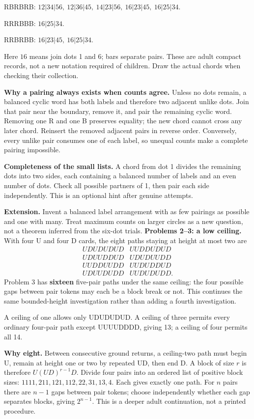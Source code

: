 \documentclass[11pt]{article}
\begin{document}
RBRBRB: \(12|34|56,\ 12|36|45,\ 14|23|56,\ 16|23|45,\ 16|25|34\).

RRRBBB: \(16|25|34\).

RRBRBB: \(16|23|45,\ 16|25|34\).

Here \(16\) means join dots 1 and 6; bars separate pairs. These are adult compact records, not a new notation required of children. Draw the actual chords when checking their collection.

\textbf{Why a pairing always exists when counts agree.} Unless no dots remain, a balanced cyclic word has both labels and therefore two adjacent unlike dots. Join that pair near the boundary, remove it, and pair the remaining cyclic word. Removing one R and one B preserves equality; the new chord cannot cross any later chord. Reinsert the removed adjacent pairs in reverse order. Conversely, every unlike pair consumes one of each label, so unequal counts make a complete pairing impossible.

\textbf{Completeness of the small lists.} A chord from dot 1 divides the remaining dots into two sides, each containing a balanced number of labels and an even number of dots. Check all possible partners of 1, then pair each side independently. This is an optional hint after genuine attempts.

\textbf{Extension.} Invent a balanced label arrangement with as few pairings as possible and one with many. Treat maximum counts on larger circles as a new question, not a theorem inferred from the six-dot trials.
\newpage
\textbf{Problems 2--3: a low ceiling.} With four U and four D cards, the eight paths staying at height at most two are
\[
\begin{array}{ll}
UDUDUDUD&UUDDUDUD\\
UDUUDDUD&UDUDUUDD\\
UUDDUUDD&UUDUDDUD\\
UDUUDUDD&UUDUDUDD.
\end{array}
\]
Problem 3 has \textbf{sixteen} five-pair paths under the same ceiling: the four possible gaps between pair tokens may each be a block break or not. This continues the same bounded-height investigation rather than adding a fourth investigation.

A ceiling of one allows only UDUDUDUD. A ceiling of three permits every ordinary four-pair path except UUUUDDDD, giving 13; a ceiling of four permits all 14.

\textbf{Why eight.} Between consecutive ground returns, a ceiling-two path must begin U, remain at height one or two by repeated UD, then end D. A block of size \(r\) is therefore \(U(UD)^{r-1}D\). Divide four pairs into an ordered list of positive block sizes: \(1111,211,121,112,22,31,13,4\). Each gives exactly one path. For \(n\) pairs there are \(n-1\) gaps between pair tokens; choose independently whether each gap separates blocks, giving \(2^{n-1}\). This is a deeper adult continuation, not a printed procedure.
\end{document}
